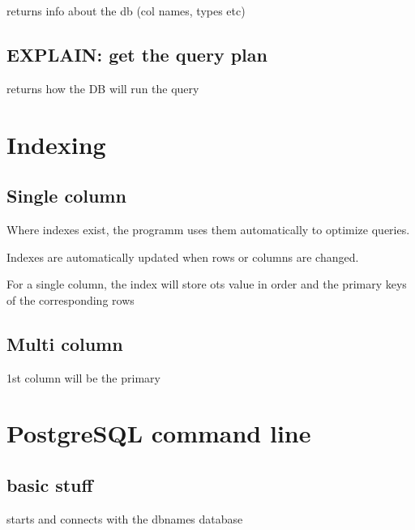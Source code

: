 		 returns info about the db (col names, types etc)

	\subsection{EXPLAIN: get the query plan}

		 returns how the DB will run the query

\section{Indexing}

	\subsection{Single column}

		Where indexes exist, the programm uses them automatically to optimize queries.

		Indexes are automatically updated when rows or columns are changed.

		For a single column, the index will store ots value in order and the primary keys of the corresponding rows
		


\subsection{Multi column}


		1st column will be the primary






\section{PostgreSQL command line}

	\subsection{basic stuff}
	

		 starts and connects with the dbnames database

